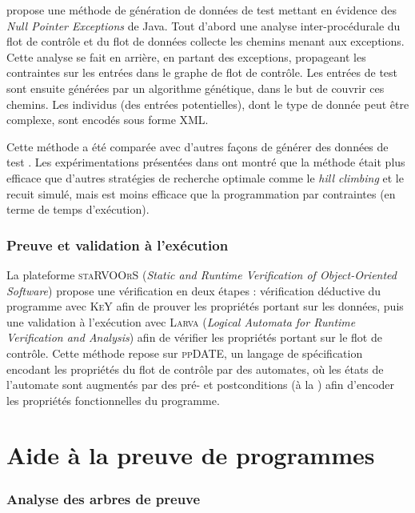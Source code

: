 \cite{Romano/ICST11} propose une méthode de génération de données
de test mettant en évidence des {\em Null Pointer Exceptions} de Java. Tout
d'abord une analyse inter-procédurale du flot de contrôle et du flot de données
collecte les chemins menant aux exceptions. Cette analyse se fait en arrière, en
partant des exceptions, propageant les contraintes sur les entrées dans le
graphe de flot de contrôle.
Les entrées de test sont ensuite générées par un algorithme génétique, dans le
but de couvrir ces chemins. Les individus (des entrées potentielles), dont le
type de donnée peut être complexe, sont encodés sous forme XML.

Cette méthode a été comparée avec d'autres façons de générer des données de
test \cite{Ahn/TAP10}.
Les expérimentations présentées dans \cite{Romano/ICST11} ont montré que la
méthode était plus efficace que d'autres stratégies de recherche optimale comme
le {\em hill climbing} et le recuit simulé, mais est moins efficace que la
programmation par contraintes (en terme de temps d'exécution).


\subsubsection*{Preuve et validation à l'exécution}


La plateforme \textsc{staRVOOrS} ({\em Static and Runtime Verification
  of Object-Oriented Software}) \cite{Ahrendt/FM15} propose une vérification en
deux étapes : vérification déductive du programme avec \textsc{KeY} afin de
prouver les propriétés portant sur les données, puis une validation à
l'exécution avec \textsc{Larva} ({\em Logical Automata for Runtime Verification
  and Analysis}) afin de vérifier les propriétés portant sur le
flot de contrôle.
Cette méthode repose sur \textsc{ppDATE}, un langage de spécification encodant
les propriétés du flot de contrôle par des automates, où les états de
l'automate sont augmentés par des pré- et postconditions (à la \jml) afin
d'encoder les propriétés fonctionnelles du programme.


\section{Aide à la preuve de programmes}
\label{sec:art-proof}


\subsubsection*{Analyse des arbres de preuve}


